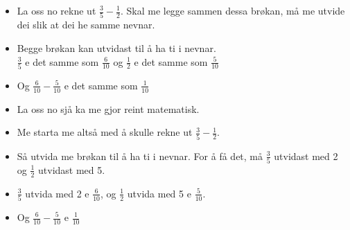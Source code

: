 \documentclass[english,hidelinks,pdftex, 11 pt, class=report,crop=false]{standalone}
\begin{document}
\begin{itemize}
\item La oss no rekne ut $ \frac{3}{5}-\frac{1}{2} $. Skal me legge sammen dessa brøkan, må me utvide dei slik at dei he samme nevnar.
\item Begge brøkan kan utvidast til å ha ti i nevnar. \\$ \frac{3}{5} $ e det samme som $ \frac{6}{10} $ og $ \frac{1}{2} $ e det samme som $ \frac{5}{10} $
\item Og $ \frac{6}{10}-\frac{5}{10} $ e det samme som $ \frac{1}{10} $
\item La oss no sjå ka me gjor reint matematisk.
\item Me starta me altså med å skulle rekne ut $ \frac{3}{5}-\frac{1}{2} $.
\item Så utvida me brøkan til å ha ti i nevnar. For å få det, må $ \frac{3}{5} $ utvidast med 2 og $ \frac{1}{2} $ utvidast med 5.
\item $ \frac{3}{5} $ utvida med 2 e $\frac{6}{10}$, og $ \frac{1}{2} $ utvida med 5 e $ \frac{5}{10} $.
\item Og $ \frac{6}{10}-\frac{5}{10} $ e $ \frac{1}{10} $
\end{itemize}
\end{document}
